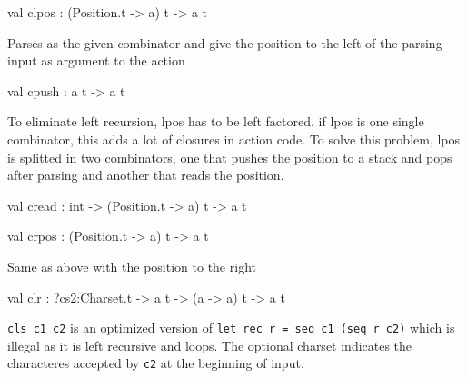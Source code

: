 \documentclass[11pt]{article}
\begin{document}
\label{val:Combinator.clpos}\begin{ocamldoccode}
val clpos : (Position.t -> {\textquotesingle}a) t -> {\textquotesingle}a t
\end{ocamldoccode}
\begin{ocamldocdescription}
Parses as the given combinator and give the position
    to the left of the parsing input as argument to the action


\end{ocamldocdescription}




\label{val:Combinator.cpush}\begin{ocamldoccode}
val cpush : {\textquotesingle}a t -> {\textquotesingle}a t
\end{ocamldoccode}
\begin{ocamldocdescription}
To eliminate left recursion, lpos has to be left factored.
    if lpos is one single combinator, this adds a lot of closures
    in action code. To solve this problem, lpos is splitted in
    two combinators, one that pushes the position to a stack and pops
    after parsing and another that reads the position.


\end{ocamldocdescription}




\label{val:Combinator.cread}\begin{ocamldoccode}
val cread : int -> (Position.t -> {\textquotesingle}a) t -> {\textquotesingle}a t
\end{ocamldoccode}




\label{val:Combinator.crpos}\begin{ocamldoccode}
val crpos : (Position.t -> {\textquotesingle}a) t -> {\textquotesingle}a t
\end{ocamldoccode}
\begin{ocamldocdescription}
Same as above with the position to the right


\end{ocamldocdescription}




\label{val:Combinator.clr}\begin{ocamldoccode}
val clr : ?cs2:Charset.t ->
  {\textquotesingle}a t -> ({\textquotesingle}a -> {\textquotesingle}a) t -> {\textquotesingle}a t
\end{ocamldoccode}
\begin{ocamldocdescription}
{\tt{cls c1 c2}} is an optimized version of {\tt{let rec r = seq c1 (seq r c2)}}
    which is illegal as it is left recursive and loops. The optional charset indicates
    the characteres accepted by {\tt{c2}} at the beginning of input.


\end{ocamldocdescription}
\end{document}
